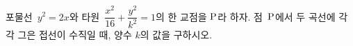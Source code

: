 포물선~$y^2=2x$와 타원~$\dfrac{x^2}{16}+\dfrac{y^2}{k^2}=1$의 한 교점을 $\mathrm{P}$라 하자. 점~$\mathrm{P}$에서 두 곡선에 각각 그은 접선이 수직일 때, 양수 $k$의 값을 구하시오.
